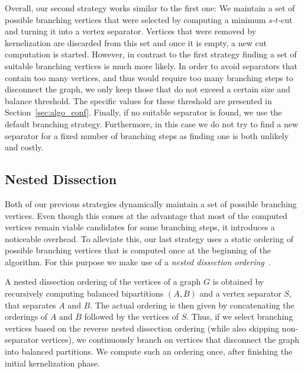\documentclass[a4paper,UKenglish,cleveref, autoref, thm-restate]{lipics-v2021}
\begin{document}
Overall, our second strategy works similar to the first one: We maintain a set of possible branching vertices that were selected by computing a minimum $s$-$t$-cut and turning it into a vertex separator.
Vertices that were removed by kernelization are discarded from this set and once it is empty, a new cut computation is started.
However, in contrast to the first strategy finding a set of suitable branching vertices is much more likely.
In order to avoid separators that contain too many vertices, and thus would require too many branching steps to disconnect the graph, we only keep those that do not exceed a certain size and balance threshold.
The specific values for these threshold are presented in Section~\ref{sec:algo_conf}.
Finally, if no suitable separator is found, we use the default branching strategy.
Furthermore, in this case we do not try to find a new separator for a fixed number of branching steps as finding one is both unlikely and costly.

\subsection{Nested Dissection}
Both of our previous strategies dynamically maintain a set of possible branching vertices.
Even though this comes at the advantage that most of the computed vertices remain viable candidates for some branching steps, it introduces a noticeable overhead.
To alleviate this, our last strategy uses a static ordering of possible branching vertices that is computed once at the beginning of the algorithm.
For this purpose we make use of a \emph{nested dissection ordering}~\cite{george1973nested}.

A nested dissection ordering of the vertices of a graph $G$ is obtained by recursively computing balanced bipartitions $(A,B)$ and a vertex separator $S$, that separates $A$ and $B$.
The actual ordering is then given by concatenating the orderings of $A$ and $B$ followed by the vertices of $S$.
Thus, if we select branching vertices based on the reverse nested dissection
ordering (while also skipping non-separator vertices), we continuously branch on vertices that disconnect the graph into balanced partitions. 
We compute such an ordering once, after finishing the initial kernelization phase.
\end{document}
